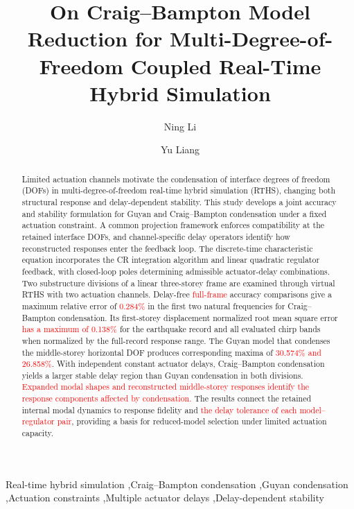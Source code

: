 \documentclass[a4paper,fleqn,review,12pt]{cas-sc}
\numberwithin{equation}{section}
\newcommand{\rev}[1]{\textcolor{red}{#1}}
\begin{document}
\let\WriteBookmarks\relax
\def\floatpagepagefraction{1}
\def\textpagefraction{.001}

\title[mode=title]{On Craig--Bampton Model Reduction for Multi-Degree-of-Freedom Coupled Real-Time Hybrid Simulation}

\author{Ning Li}
\author{Yu Liang}

\begin{abstract}
Limited actuation channels motivate the condensation of interface degrees of freedom (DOFs) in multi-degree-of-freedom real-time hybrid simulation (RTHS), changing both structural response and delay-dependent stability.
This study develops a joint accuracy and stability formulation for Guyan and Craig--Bampton condensation under a fixed actuation constraint.
A common projection framework enforces compatibility at the retained interface DOFs, and channel-specific delay operators identify how reconstructed responses enter the feedback loop.
The discrete-time characteristic equation incorporates the CR integration algorithm and linear quadratic regulator feedback, with closed-loop poles determining admissible actuator-delay combinations.
Two substructure divisions of a linear three-storey frame are examined through virtual RTHS with two actuation channels.
Delay-free \rev{full-frame} accuracy comparisons give a maximum relative error of \rev{0.284\%} in the first two natural frequencies for Craig--Bampton condensation.
Its first-storey displacement normalized root mean square error \rev{has a maximum of 0.138\%} for the earthquake record and all evaluated chirp bands when normalized by the full-record response range.
The Guyan model that condenses the middle-storey horizontal DOF produces corresponding maxima of \rev{30.574\% and 26.858\%}.
With independent constant actuator delays, Craig--Bampton condensation yields a larger stable delay region than Guyan condensation in both divisions.
\rev{Expanded modal shapes and reconstructed middle-storey responses identify the response components affected by condensation.}
The results connect the retained internal modal dynamics to response fidelity and \rev{the delay tolerance of each model--regulator pair}, providing a basis for reduced-model selection under limited actuation capacity.

\end{abstract}

\begin{keywords}
	\raggedright
	Real-time hybrid simulation
	\sep Craig--Bampton condensation
	\sep Guyan condensation
	\sep Actuation constraints
	\sep Multiple actuator delays
	\sep Delay-dependent stability
\end{keywords}
\end{document}

